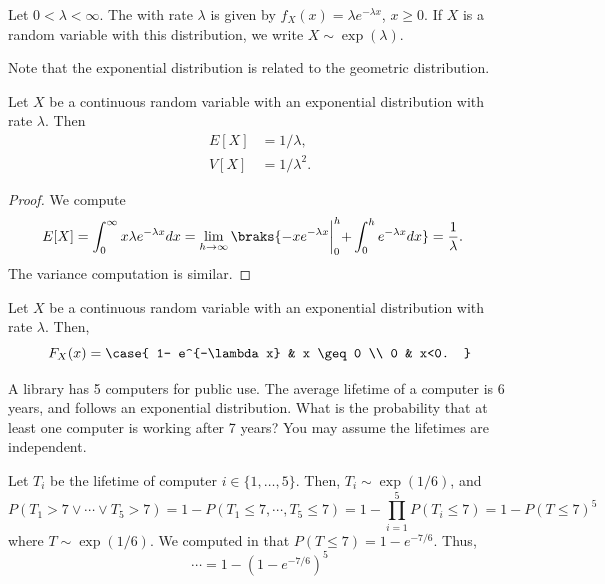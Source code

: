 \documentclass[11pt]{article}
\begin{document}
\begin{defn}
Let $0 < \lambda < \infty$. The  with rate $\lambda$ is given by $f_X(x)=\lambda e^{-\lambda x}$, $x \geq 0$. If $X$ is a random variable with this distribution, we write $X \sim \exp(\lambda)$.
\end{defn}

Note that the exponential distribution is related to the geometric distribution.

\begin{prop} \label{prop:expect-var-expon-distr}
Let $X$ be a continuous random variable with an exponential distribution with rate $\lambda$. Then
\begin{align*}
    E[X] &=  1/\lambda, \\
    V[X] &= 1/\lambda^2.
\end{align*}
\end{prop}

\begin{proof}
We compute
\begin{align*}
    E[X] &=\int_0^\infty x \lambda e^{-\lambda x}dx=\lim_{h \to \infty}\braks{ -xe^{-\lambda x} \biggl |_0^h + \int_0^h e^{-\lambda x}dx } = \frac{1}{\lambda}.
\end{align*}
The variance computation is similar.
\end{proof}

\begin{prop} \label{prop:exponential-cumulative}
Let $X$ be a continuous random variable with an exponential distribution with rate $\lambda$. Then,
\[
F_X(x) = \case{ 1- e^{-\lambda x} & x \geq 0 \\ 0 & x<0. }
\]
\end{prop}


\begin{ex}
A library has 5 computers for public use. The average lifetime of a computer is 6 years, and follows an exponential distribution. What is the probability that at least one computer is working after 7 years? You may assume the lifetimes are independent.
\end{ex}

\begin{solution}
Let $T_i$ be the lifetime of computer $i \in\{1,\dots,5\}$. Then, $T_i \sim \exp(1/6)$, and
\[
P(T_1>7 \lor \cdots \lor T_5 > 7) = 1-P(T_1 \leq 7, \cdots, T_5 \leq 7)=1-\prod_{i=1}^5P(T_i\leq 7)=1-P(T \leq 7)^5
\]
where $T \sim \exp(1/6)$. We computed in  that $P(T \leq 7)=1-e^{-7/6}$. Thus,
\[
\cdots = 1-(1-e^{-7/6})^5
\]
\end{solution}
\end{document}
